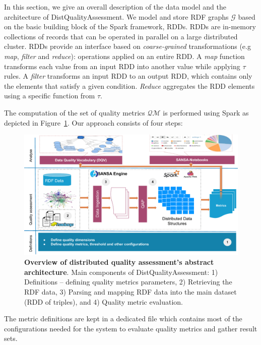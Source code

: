 In this section, we give an overall description of the data model and the architecture of DistQualityAssessment.
We model and store \gls{RDF} graphs $\mathcal{G}$ based on the basic building block of the Spark framework, \gls{RDD}s. 
\gls{RDD}s are in-memory collections of records that can be operated in parallel on a large distributed cluster.
\gls{RDD}s provide an interface based on \emph{coarse-grained} transformations (e.g \emph{map}, \emph{filter} and \emph{reduce}): operations applied on an entire \gls{RDD}. 
A \emph{map} function transforms each value from an input \gls{RDD} into another value while applying $\tau$ rules.
A \emph{filter} transforms an input \gls{RDD} to an output \gls{RDD}, which contains only the elements that satisfy a given condition.
\emph{Reduce} aggregates the \gls{RDD} elements using a specific function from $\tau$.

The computation of the set of quality metrics $\mathcal{QM}$ is performed using Spark as depicted in Figure~\ref{fig:DistQualityAssessmentSystem}.
Our approach consists of four steps: 

\begin{figure}
\centering
\includegraphics[width=1.0\columnwidth]{images/5_distqualityassessment/distqualityassessment-architecture.pdf}
\caption{\textbf{Overview of distributed quality assessment's abstract architecture}.
Main components of DistQualityAssessment: 1) Definitions -- defining quality metrics parameters, 2) Retrieving the RDF data, 3) Parsing and mapping RDF data into the main dataset (RDD of triples), and 4) Quality metric evaluation.}
\label{fig:DistQualityAssessmentSystem}
\end{figure}

 The metric definitions are kept in a dedicated file which contains most of the configurations needed for the system to evaluate quality metrics and gather result sets.

